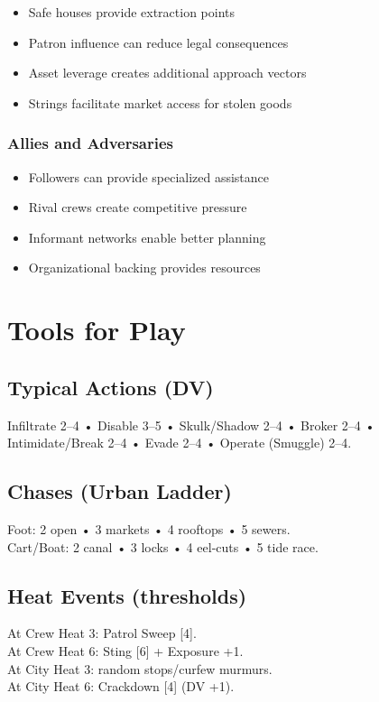 \documentclass[11pt]{article}
\begin{document}
\begin{itemize}
    \item Safe houses provide extraction points
    \item Patron influence can reduce legal consequences
    \item Asset leverage creates additional approach vectors
    \item Strings facilitate market access for stolen goods
\end{itemize}

\subsubsection{Allies and Adversaries}

\begin{itemize}
    \item Followers can provide specialized assistance
    \item Rival crews create competitive pressure
    \item Informant networks enable better planning
    \item Organizational backing provides resources
\end{itemize}

\section{Tools for Play}
\subsection{Typical Actions (DV)}
Infiltrate 2--4 • Disable 3--5 • Skulk/Shadow 2--4 • Broker 2--4 • Intimidate/Break 2--4 • Evade 2--4 • Operate (Smuggle) 2--4.

\subsection{Chases (Urban Ladder)}
Foot: 2 open • 3 markets • 4 rooftops • 5 sewers. \\
Cart/Boat: 2 canal • 3 locks • 4 eel‑cuts • 5 tide race.

\subsection{Heat Events (thresholds)}
At Crew Heat 3: Patrol Sweep [4]. \\
At Crew Heat 6: Sting [6] + Exposure +1. \\
At City Heat 3: random stops/curfew murmurs. \\
At City Heat 6: Crackdown [4] (DV +1).
\end{document}
